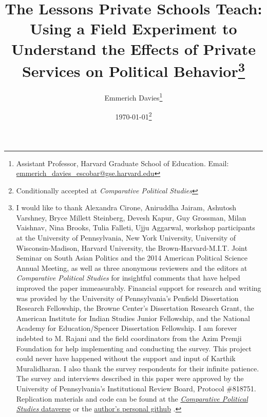 \title{The Lessons Private Schools Teach: Using a Field Experiment to Understand the Effects of Private Services on Political Behavior\thanks{I would like to thank Alexandra Cirone, Aniruddha Jairam, Ashutosh Varshney, Bryce Millett Steinberg, Devesh Kapur, Guy Grossman, Milan Vaishnav, Nina Brooks, Tulia Falleti, Ujju Aggarwal, workshop participants at the University of Pennsylvania, New York University, University of Wisconsin-Madison, Harvard University, the Brown-Harvard-M.I.T. Joint Seminar on South Asian Politics and the 2014 American Political Science Annual Meeting, as well as three anonymous reviewers and the editors at \emph{Comparative Political Studies} for insightful comments that have helped improved the paper immeasurably.  Financial support for research and writing was provided by the University of Pennsylvania's Penfield Dissertation Research Fellowship, the Browne Center's Dissertation Research Grant, the American Institute for Indian Studies Junior Fellowship, and the National Academy for Education/Spencer Dissertation Fellowship.  I am forever indebted to M. Rajani and the field coordinators from the Azim Premji Foundation for help implementing and conducting the survey.  This project could never have happened without the support and input of Karthik Muralidharan.  I also thank the survey respondents for their infinite patience.  The survey and interviews described in this paper were approved by the University of Pennsylvania's Institutional Review Board, Protocol \#818751. Replication materials and code can be found at the \href{https://doi.org/10.7910/DVN/TDUVCJ}{\emph{Comparative Political Studies} dataverse} or the \href{https://github.com/eeemda/cps-downstream}{author's personal github} \citep{Davies2022a}.}}

\author{Emmerich Davies\footnote{Assistant Professor, Harvard Graduate School of Education. Email: \href{mailto:emmerich_davies_escobar@gse.harvard.edu}{emmerich\_davies\_escobar@gse.harvard.edu}}}

\date{\today\footnote{Conditionally accepted at \emph{Comparative Political Studies}}}